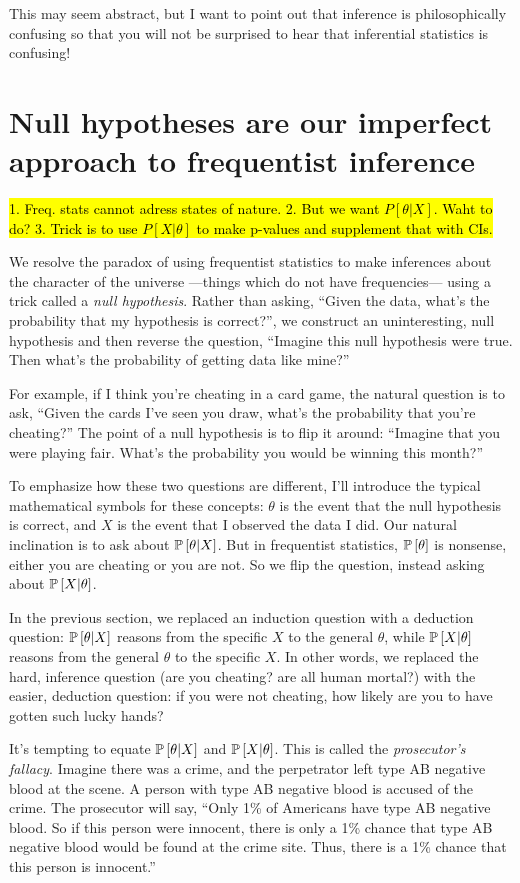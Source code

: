 This may seem abstract, but I want to point out that inference is philosophically confusing so that you will not be surprised to hear that inferential statistics is confusing!

\section{Null hypotheses are our imperfect approach to frequentist inference}

\hl{1. Freq. stats cannot adress states of nature. 2. But we want $P[\theta|X]$. Waht to do? 3. Trick is to use $P[X|\theta]$ to make p-values and supplement that with CIs.}

We resolve the paradox of using frequentist statistics to make inferences about the character of the universe ---things which do not have frequencies--- using a trick called a \emph{null hypothesis}. Rather than asking, ``Given the data, what's the probability that my hypothesis is correct?'', we construct an uninteresting, null hypothesis and then reverse the question, ``Imagine this null hypothesis were true. Then what's the probability of getting data like mine?''

For example, if I think you're cheating in a card game, the natural question is to ask, ``Given the cards I've seen you draw, what's the probability that you're cheating?'' The point of a null hypothesis is to flip it around: ``Imagine that you were playing fair. What's the probability you would be winning this month?''

To emphasize how these two questions are different, I'll introduce the typical
mathematical symbols for these concepts: $\theta$ is the event that the null
hypothesis is correct, and $X$ is the event that I observed the data I did. Our
natural inclination is to ask about $\mathbb{P}\left[{\theta | X}\right]$. But in frequentist
statistics, $\mathbb{P}\left[{\theta}\right]$ is nonsense, either you are cheating or you are not.
So we flip the question, instead asking about $\mathbb{P}\left[{X | \theta}\right]$.


In the previous section, we replaced an induction question with a deduction question: $\mathbb{P}\left[{\theta | X}\right]$ reasons from the specific $X$ to the general $\theta$, while $\mathbb{P}\left[{X | \theta}\right]$ reasons from the general $\theta$ to the specific $X$. In other words, we replaced the hard, inference question (are you cheating? are all human mortal?) with the easier, deduction question: if you were not cheating, how likely are you to have gotten such lucky hands?

It's tempting to equate $\mathbb{P}\left[{\theta | X}\right]$ and $\mathbb{P}\left[{X | \theta}\right]$. This is called the \emph{prosecutor's fallacy}. Imagine there was a crime, and the perpetrator left type AB negative blood at the scene. A person with type AB negative blood is accused of the crime. The prosecutor will say, ``Only 1\% of Americans have type AB negative blood. So if this person were innocent, there is only a 1\% chance that type AB negative blood would be found at the crime site. Thus, there is a 1\% chance that this person is innocent.''

